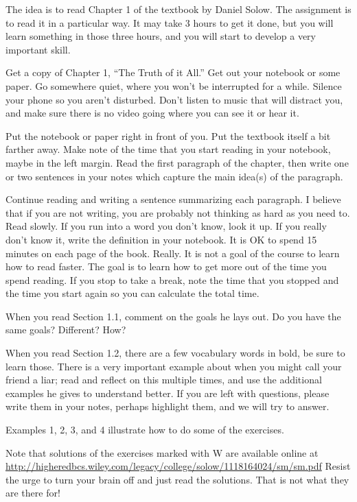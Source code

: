 
The idea is to read Chapter 1 of the textbook by Daniel Solow.
The assignment is to read it in a particular way.
It may take 3 hours to get it done, but you will learn something in those three hours, and you will start to develop a very important skill.

Get a copy of Chapter 1, ``The Truth of it All.''
Get out your notebook or some paper.
Go somewhere quiet, where you won't be interrupted for a while.
Silence your phone so you aren't disturbed.
Don't listen to music that will distract you, and make sure there is no video going where you can see it or hear it.

Put the notebook or paper right in front of you.
Put the textbook itself a bit farther away.
Make note of the time that you start reading in your notebook, maybe in the left margin.
Read the first paragraph of the chapter, then write one or two sentences in your notes which capture the main idea(s) of the paragraph.

Continue reading and writing a sentence summarizing each paragraph.
I believe that if you are not writing, you are probably not thinking as hard as you need to.
Read slowly.
If you run into a word you don't know, look it up.  
If you really don't know it, write the definition in your notebook.
It is OK to spend 15 minutes on each page of the book.  Really.
It is not a goal of the course to learn how to read faster.
The goal is to learn how to get more out of the time you spend reading.
If you stop to take a break, note the time that you stopped and the time you start again so you can calculate the total time.

When you read Section 1.1, comment on the goals he lays out.  Do you have the same goals?  Different?  How?

When you read Section 1.2, there are a few vocabulary words in bold, be sure to learn those.
There is a very important example about when you might call your friend a liar; read and reflect on this multiple times, and use the additional examples he gives to understand better.
If you are left with questions, please write them in your notes, perhaps highlight them, and we will try to answer.

Examples 1, 2, 3, and 4 illustrate how to do some of the exercises.

Note that solutions of the exercises marked with W are available online at \url{http://higheredbcs.wiley.com/legacy/college/solow/1118164024/sm/sm.pdf}
Resist the urge to turn your brain off and just read the solutions.  That is not what they are there for!


